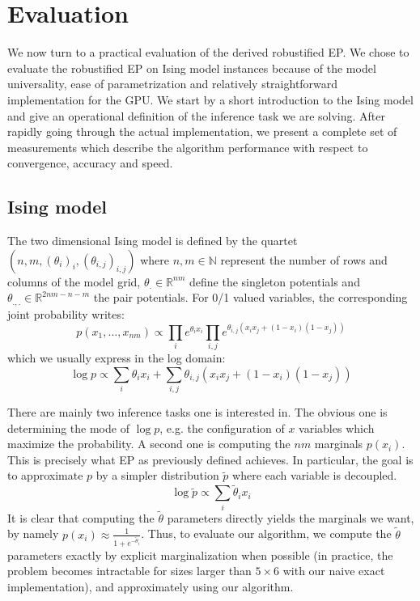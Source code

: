 \documentclass[times, 10pt,twocolumn]{article}
\begin{document}
\section{Evaluation}
We now turn to a practical evaluation of the derived robustified EP. We chose to evaluate the robustified EP on Ising model instances because of the model universality, ease of parametrization and relatively straightforward implementation for the GPU. We start by a short introduction to the Ising model and give an operational definition of the inference task we are solving. After rapidly going through the actual implementation, we present a complete set of measurements which describe the algorithm performance with respect to convergence, accuracy and speed.

\subsection{Ising model}
The two dimensional Ising model is defined by the quartet $(n, m, (\theta_i)_i, (\theta_{i,j})_{i,j})$ where $n, m \in \mathbb{N}$ represent the number of rows and columns of the model grid, $\theta_. \in \mathbb{R}^{nm}$ define the singleton potentials and $\theta_{.,.} \in \mathbb{R}^{2nm-n-m}$ the pair potentials. For 0/1 valued variables, the corresponding joint probability writes:
\[
	p(x_1,\dots,x_{nm}) \propto \prod_i e^{\theta_i x_i} \prod_{i,j} e^{\theta_{i,j} (x_i x_j + (1-x_i)(1-x_j))}
\]
which we usually express in the log domain:
\[
	\log p \propto \sum_i \theta_i x_i + \sum_{i,j} \theta_{i,j} (x_i x_j + (1-x_i)(1-x_j))
\]

There are mainly two inference tasks one is interested in. The obvious one is determining the mode of $\log p$, e.g. the configuration of $x$ variables which maximize the probability. A second one is computing the $nm$ marginals $p(x_i)$. This is precisely what EP as previously defined achieves. In particular, the goal is to approximate $p$ by a simpler distribution $\tilde p$ where each variable is decoupled. 
\[
	\log \tilde p \propto \sum_i \tilde \theta_i x_i
\]
It is clear that computing the $\tilde \theta$ parameters directly yields the marginals we want, by namely $p(x_i) \approx \frac{1}{1+e^{-\tilde \theta_i}}$. Thus, to evaluate our algorithm, we compute the $\tilde \theta$ parameters exactly by explicit marginalization when possible (in practice, the problem becomes intractable for sizes larger than $5 \times 6$ with our naive exact implementation), and approximately using our algorithm.
\end{document}
